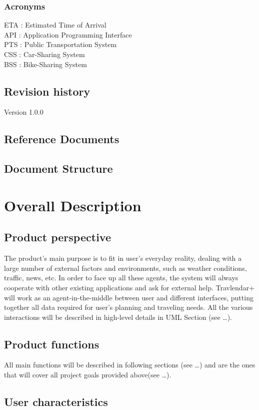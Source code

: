 \documentclass{article}
\begin{document}
\subsubsection{Acronyms}
ETA : Estimated Time of Arrival\\ API : Application Programming Interface\\ PTS : Public Transportation System\\ CSS : Car-Sharing System\\ BSS : Bike-Sharing System
\subsection{Revision history}
Version 1.0.0
\subsection{Reference Documents}

\subsection{Document Structure}
\section{Overall Description}
\subsection{Product perspective}
The product’s main purpose is to fit in user’s everyday reality, dealing with a large number of external factors and environments, such as weather conditions, traffic, news, etc. In order to face up all these agents, the system will always cooperate with other existing applications and ask for external help. Travlendar+ will work as an agent-in-the-middle between user and different interfaces, putting together all data required for user’s planning and traveling needs. All the various interactions will be described in high-level details in UML Section (see …). 
\subsection{Product functions}
All main functions will be described in following sections (see …) and are the ones that will cover all project goals provided above(see …). 
\subsection{User characteristics}
\end{document}
